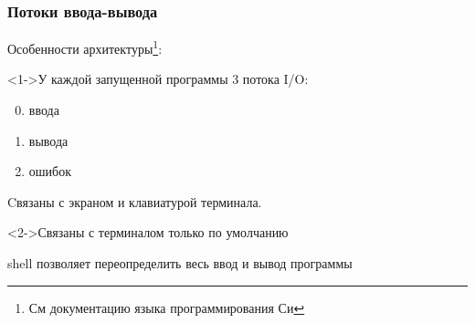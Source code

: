 \begin{frame}
  \frametitle{Потоки ввода-вывода}
  
  Особенности архитектуры\footnote{См документацию языка программирования Си}:
  \begin{block}<1->{У каждой запущенной программы 3 потока I/O:}
    \begin{enumerate}
      \setcounter{enumi}{-1}
      \item ввода
      \item вывода
      \item ошибок
    \end{enumerate}

    Cвязаны с экраном и клавиатурой терминала. \pause \newline
  \end{block}

  \begin{block}<2->{Связаны с терминалом только по умолчанию}

    \alert{shell позволяет переопределить весь ввод и вывод программы}
  \end{block}

\end{frame}
